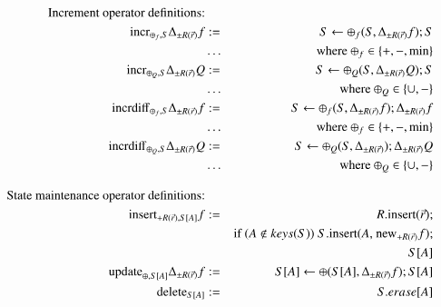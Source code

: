\documentclass{article}
\begin{document}
%
%
\begin{figure*}
\begin{eqnarray}
\mbox{Increment operator definitions:} && \nonumber\\
\label{eq:incr1}
\algincr_{\oplus_f, S} \Delta_{\pm R(\vec{r})} f &:=& S \leftarrow
\oplus_f(S, \Delta_{\pm R(\vec{r})} f); S
\\
\nonumber &\dots& \mbox{where $\oplus_f \in \{+,-,\min\}$}
\\
\label{eq:incr2}
\algincr_{\oplus_Q, S} \Delta_{\pm R(\vec{r})} Q &:=& S \leftarrow
\oplus_Q(S, \Delta_{\pm R(\vec{r})} Q); S
\\
\nonumber &\dots& \mbox{where $\oplus_Q \in \{\cup, -\}$}
\\
%
%
\label{eq:incr3}
\algincrdiff_{\oplus_f, S} \Delta_{\pm R(\vec{r})} f &:=&
S \leftarrow \oplus_f(S, \Delta_{\pm R(\vec{r})} f); \Delta_{\pm R(\vec{r})} f
\\
\nonumber &\dots& \mbox{where $\oplus_f \in \{+, -,\min\}$}
\\
\label{eq:incr4}
\algincrdiff_{\oplus_Q, S} \Delta_{\pm R(\vec{r})} Q &:=&
S \leftarrow \oplus_Q(S, \Delta_{\pm R(\vec{r})}); \Delta_{\pm R(\vec{r})} Q
\\
\nonumber &\dots& \mbox{where $\oplus_Q \in \{\cup, -\}$}
%
%
\\[2ex]
\mbox{State maintenance operator definitions:} && \nonumber
\\
\label{eq:sm1}
\alginsert_{+R(\vec{r}), S[A]} f
&:=&
\mbox{$R$.insert($\vec{r}$)};
\\
\nonumber
&&
\mbox{if ($A \notin keys(S)$) $S$.insert($A$,  $\algnew_{+R(\vec{r})} f$)};
\\
\nonumber
&&
S[A]
\\
\label{eq:sm2}
\algupdate_{\oplus, S[A]} \Delta_{\pm R(\vec{r})} f
&:=&
S[A] \leftarrow \oplus(S[A], \Delta_{\pm R(\vec{r})} f);
S[A]
\\
\label{eq:sm3}
\algdelete_{S[A]}
&:=&
S.erase[A]
\end{eqnarray}
\end{figure*}
\end{document}
